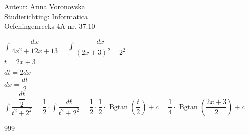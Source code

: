 \documentclass[a4paper]{article}
\begin{document}
\noindent \large Auteur: Anna Voronovska \\
\noindent \large Studierichting: Informatica \\
\noindent \large Oefeningenreeks 4A nr. 37.10 \\

\medskip

\normalsize
$\displaystyle\int \dfrac{dx}{4x^2+12x+13}=\displaystyle\int \dfrac{dx}{(2x+3)^2+2^2}$\\

$t=2x+3$\\

$dt=2dx$\\

$dx=\dfrac{dt}{2}$\\

$\displaystyle\int \dfrac{\dfrac{dt}{2}}{t^2+2^2}=
\dfrac{1}{2}\cdot \displaystyle\int\dfrac{dt}{t^2+2^2}=
\dfrac{1}{2} \cdot \dfrac{1}{2} \cdot \operatorname{Bgtan} \left(\dfrac{t}{2}\right)+c=
\dfrac{1}{4}\cdot \operatorname{Bgtan} \left(\dfrac{2x+3}{2}\right)+c$\\




\begin{thebibliography}{999}
\end{thebibliography}
\end{document}
